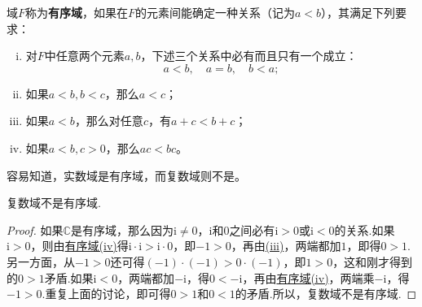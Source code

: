 \documentclass[../../main.tex]{subfiles}%
\begin{document}
\begin{definition}[有序域]\label{definition:有序域}
域\(F\)称为\textbf{有序域}，如果在\(F\)的元素间能确定一种关系（记为\(a < b\)），其满足下列要求：
\begin{enumerate}[(i)]
\item\label{有序域:(i)} 对\(F\)中任意两个元素\(a,b\)，下述三个关系中必有而且只有一个成立：
\[
a < b, \quad a = b, \quad b < a;
\]

\item\label{有序域:(ii)} 如果\(a < b, b < c\)，那么\(a < c\)；

\item\label{有序域:(iii)} 如果\(a < b\)，那么对任意\(c\)，有\(a + c < b + c\)；

\item\label{有序域:(iv)} 如果\(a < b, c > 0\)，那么\(ac < bc\)。
\end{enumerate}
\end{definition}
\begin{note}
容易知道，实数域是有序域，而复数域则不是。
\end{note}

\begin{theorem}\label{theorem:复数域不是有序域}
复数域不是有序域.
\end{theorem}
\begin{proof}

如果\(\mathbb{C}\)是有序域，那么因为\(\mathrm{i} \neq 0\)，\(\mathrm{i}\)和\(0\)之间必有\(\mathrm{i} > 0\)或\(\mathrm{i} < 0\)的关系.如果\(\mathrm{i} > 0\)，则由\hyperref[definition:有序域]{有序域(iv)}得\(\mathrm{i} \cdot \mathrm{i} > \mathrm{i} \cdot 0\)，即\(-1 > 0\)，再由\hyperref[有序域:(iii)]{(iii)}，两端都加\(1\)，即得\(0 > 1\).另一方面，从\(-1 > 0\)还可得\((-1) \cdot (-1) > 0 \cdot (-1)\)，即\(1 > 0\)，这和刚才得到的\(0 > 1\)矛盾.如果\(\mathrm{i} < 0\)，两端都加\(-\mathrm{i}\)，得\(0 < -\mathrm{i}\)，再由\hyperref[definition:有序域]{有序域(iv)}，两端乘\(-\mathrm{i}\)，得\(-1 > 0\).重复上面的讨论，即可得\(0 > 1\)和\(0 < 1\)的矛盾.所以，复数域不是有序域. 

\end{proof}
\end{document}
